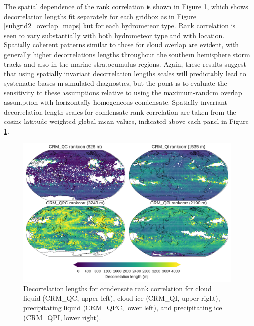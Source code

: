 The spatial dependence of the rank correlation is shown in Figure \ref{subgrid2_rankcorr_maps}, which shows decorrelation lengths fit separately for each gridbox as in Figure \ref{subgrid2_overlap_maps} but for each hydrometeor type. Rank correlation is seen to vary substantially with both hydrometeor type and with location. Spatially coherent patterns similar to those for cloud overlap are evident, with generally higher decorrelations lengths throughout the southern hemisphere storm tracks and also in the marine stratocumulus regions. Again, these results suggest that using spatially invariant decorrelation lengths scales will predictably lead to systematic biases in simulated diagnostics, but the point is to evaluate the sensitivity to these assumptions relative to using the maximum-random overlap assumption with horizontally homogeneous condensate. Spatially invariant decorrelation length scales for condensate rank correlation are taken from the cosine-latitude-weighted global mean values, indicated above each panel in Figure \ref{subgrid2_rankcorr_maps}.

\begin{figure}
\centering
\includegraphics[width=\columnwidth]{graphics/subgrid2_rankcorr_maps.pdf}
\caption{Decorrelation lengths for condensate rank correlation for cloud liquid (CRM\_QC, upper left), cloud ice (CRM\_QI, upper right), precipitating liquid (CRM\_QPC, lower left), and precipitating ice (CRM\_QPI, lower right).}
\label{subgrid2_rankcorr_maps}
\end{figure}

